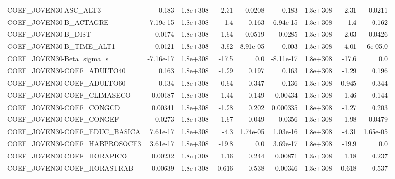 \begin{tabular}{lrrrrrrrr}
COEF\_JOVEN30-ASC\_ALT3             &       0.183 &     1.8e+308 &      2.31 &   0.0208 &      0.183 &    1.8e+308 &         2.31 &        0.0211 \\
COEF\_JOVEN30-B\_ACTAGRE            &    7.19e-15 &     1.8e+308 &      -1.4 &    0.163 &   6.94e-15 &    1.8e+308 &         -1.4 &         0.162 \\
COEF\_JOVEN30-B\_DIST               &      0.0174 &     1.8e+308 &      1.94 &   0.0519 &    -0.0285 &    1.8e+308 &         2.03 &        0.0426 \\
COEF\_JOVEN30-B\_TIME\_ALT1          &     -0.0121 &     1.8e+308 &     -3.92 & 8.91e-05 &      0.003 &    1.8e+308 &        -4.01 &       6e-05.0 \\
COEF\_JOVEN30-Beta\_sigma\_s         &   -7.16e-17 &     1.8e+308 &     -17.5 &      0.0 &  -8.11e-17 &    1.8e+308 &        -17.6 &           0.0 \\
COEF\_JOVEN30-COEF\_ADULTO40        &       0.163 &     1.8e+308 &     -1.29 &    0.197 &      0.163 &    1.8e+308 &        -1.29 &         0.196 \\
COEF\_JOVEN30-COEF\_ADULTO60        &       0.134 &     1.8e+308 &     -0.94 &    0.347 &      0.136 &    1.8e+308 &       -0.945 &         0.344 \\
COEF\_JOVEN30-COEF\_CLIMASECO       &    -0.00187 &     1.8e+308 &     -1.44 &    0.149 &    0.00434 &    1.8e+308 &        -1.46 &         0.144 \\
COEF\_JOVEN30-COEF\_CONGCD          &     0.00341 &     1.8e+308 &     -1.28 &    0.202 &   0.000335 &    1.8e+308 &        -1.27 &         0.203 \\
COEF\_JOVEN30-COEF\_CONGEF          &      0.0273 &     1.8e+308 &     -1.97 &    0.049 &     0.0356 &    1.8e+308 &        -1.98 &        0.0479 \\
COEF\_JOVEN30-COEF\_EDUC\_BASICA     &    7.61e-17 &     1.8e+308 &      -4.3 & 1.74e-05 &   1.03e-16 &    1.8e+308 &        -4.31 &      1.65e-05 \\
COEF\_JOVEN30-COEF\_HABPROSOCF3     &    3.61e-17 &     1.8e+308 &     -19.8 &      0.0 &   3.69e-17 &    1.8e+308 &        -19.9 &           0.0 \\
COEF\_JOVEN30-COEF\_HORAPICO        &     0.00232 &     1.8e+308 &     -1.16 &    0.244 &    0.00871 &    1.8e+308 &        -1.18 &         0.237 \\
COEF\_JOVEN30-COEF\_HORASTRAB       &     0.00639 &     1.8e+308 &    -0.616 &    0.538 &   -0.00346 &    1.8e+308 &       -0.618 &         0.537 \\

\end{tabular}
